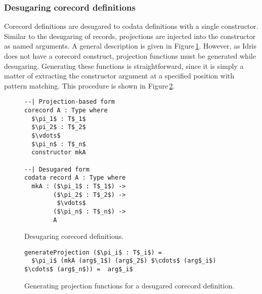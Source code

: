 \subsubsection{Desugaring corecord definitions}

Corecord definitions are desugared to codata definitions with a single constructor. Similar to the desugaring of records, projections are injected into the constructor as named arguments. A general description is given in Figure\,\ref{fig:desugar_corecords}. However, as Idris does not have a corecord construct, projection functions must be generated while desugaring. Generating these functions is straightforward, since it is simply a matter of extracting the constructor argument at a specified position with pattern matching. This procedure is shown in Figure\,\ref{fig:generate_projections}.

\begin{figure}
\begin{lstlisting}[mathescape]
--| Projection-based form
corecord A : Type where
  $\pi_1$ : T$_1$
  $\pi_2$ : T$_2$
  $\vdots$
  $\pi_n$ : T$_n$
  constructor mkA

--| Desugared form
codata record A : Type where
  mkA : ($\pi_1$ : T$_1$) ->
        ($\pi_2$ : T$_2$) ->
         $\vdots$
        ($\pi_n$ : T$_n$) ->
        A
\end{lstlisting}
\caption{Desugaring corecord definitions.}
\label{fig:desugar_corecords}
\end{figure}


\begin{figure}
\begin{lstlisting}[mathescape]
generateProjection ($\pi_i$ : T$_i$) =
  $\pi_i$ (mkA (arg$_1$) (arg$_2$) $\cdots$ (arg$_i$) $\cdots$ (arg$_n$)) =  arg$_i$
\end{lstlisting}
\caption{Generating projection functions for a desugared corecord definition.}
\label{fig:generate_projections}
\end{figure}

